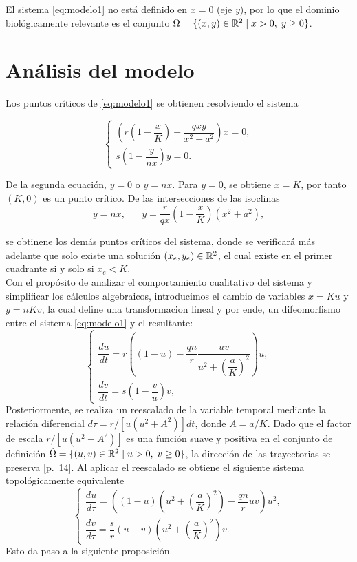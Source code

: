 \noindent El sistema \eqref{eq:modelo1} no está definido en $x=0$ (eje $y$), por lo que el dominio biológicamente relevante es el conjunto $\Omega = \{ (x,y) \in {\mathbb{R}}^2 \mid x > 0, \; y \geq 0 \}$.

\section{Análisis del modelo}

Los puntos críticos de \eqref{eq:modelo1} se obtienen resolviendo el sistema

\begin{equation}
	\begin{cases}
		\left(r \left(1 - \dfrac{x}{K}\right) - \dfrac{q x y}{x^2 + a^2}\right) x = 0, \\
		s \left(1 - \dfrac{y}{n x}\right) y = 0.
	\end{cases}
	\label{eq:sistema-eq}
\end{equation}

\noindent De la segunda ecuación, $y = 0$ o $y = n x$. Para $y=0$, se obtiene $x = K$, por tanto $(K,0)$ es un punto crítico. De las intersecciones de las isoclinas $$y = n x, \; \; \; \; \; \; y = \dfrac{r}{q x} \left(1 - \dfrac{x}{K}\right) (x^2 + a^2),$$

\noindent se obtinene los demás puntos críticos del sistema, donde se verificará más adelante que solo existe una solución $(x_e, y_e) \in {\mathbb{R}}^2$,  el cual existe en el primer cuadrante si y solo si $x_e < K$. \\

Con el propósito de analizar el comportamiento cualitativo del sistema y simplificar los cálculos algebraicos, introducimos el cambio de variables $x = K u$ y $y = n K v$, la cual define una transformacion lineal y por ende, un difeomorfismo entre el sistema \eqref{eq:modelo1} y el resultante:
\begin{equation*}
	\begin{cases}
		\dfrac{du}{dt} = r\left((1-u) - \dfrac{qn}{r} \dfrac{uv}{u^{2}+\left(\dfrac{a}{K}\right)^{2}}\right)u, \\
		\dfrac{dv}{dt} = s \left(1-\dfrac{v}{u}\right)v,
	\end{cases}
\end{equation*}
Posteriormente, se realiza un reescalado de la variable temporal mediante la relación diferencial $d\tau = r/[u(u^2+A^2)]dt $, donde $A = a/K$. Dado que el factor de escala $r/[u(u^2+A^2)]$ es una función suave y positiva en el conjunto de definición $\hat{\Omega} = \{ (u, v) \in {\mathbb{R}}^{2} \; | \; u > 0, \; v \geq 0 \}$, la dirección de las trayectorias se preserva \cite{chicone2024}[p.~14]. Al aplicar el reescalado se obtiene el siguiente sistema topológicamente equivalente
\begin{equation*}
	\begin{cases}
		\dfrac{du}{d\tau} = \left((1-u)\left(u^{2}+\left(\dfrac{a}{K}\right)^{2}\right) - \dfrac{qn}{r} uv\right)u^{2}, \\
		\dfrac{dv}{d\tau} = \dfrac{s}{r} \left(u-v\right)\left(u^{2}+\left(\dfrac{a}{K}\right)^{2}\right)v.
	\end{cases}
\end{equation*}
Esto da paso a la siguiente proposición.

